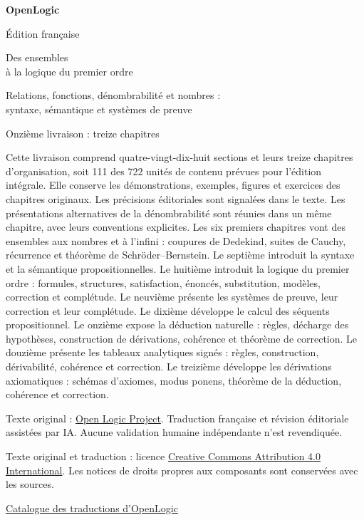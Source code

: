 \documentclass[11pt,a4paper,openany]{memoir}
\begin{document}
\frontmatter
\begin{titlingpage}
\setlength{\parindent}{0pt}
\vspace*{15mm}
{\sffamily\Huge\bfseries OpenLogic\par}
\vspace{6mm}
{\sffamily\LARGE Édition française\par}
\vspace{14mm}
{\sffamily\huge Des ensembles\\à la logique du premier ordre\par}
\vspace{5mm}
{\large Relations, fonctions, dénombrabilité et nombres :\\
syntaxe, sémantique et systèmes de preuve\par}
\vfill
{\large Onzième livraison : treize chapitres\par}
\vspace{4mm}
Cette livraison comprend quatre-vingt-dix-huit sections et leurs treize chapitres d’organisation,
soit 111 des 722 unités de contenu prévues pour l’édition intégrale.
Elle conserve les démonstrations, exemples, figures et exercices
des chapitres originaux. Les précisions éditoriales sont signalées
dans le texte. Les présentations alternatives de la dénombrabilité
sont réunies dans un même chapitre, avec leurs conventions explicites.
Les six premiers chapitres vont des ensembles aux nombres et à l’infini :
coupures de Dedekind, suites de Cauchy, récurrence et théorème de
Schröder--Bernstein. Le septième introduit la syntaxe et la sémantique
propositionnelles. Le huitième introduit la logique du premier ordre :
formules, structures, satisfaction, énoncés, substitution, modèles,
correction et complétude. Le neuvième présente les systèmes de preuve,
leur correction et leur complétude. Le dixième développe le calcul
des séquents propositionnel. Le onzième expose la déduction naturelle :
règles, décharge des hypothèses, construction de dérivations,
cohérence et théorème de correction. Le douzième présente les tableaux
analytiques signés : règles, construction, dérivabilité, cohérence et
correction. Le treizième développe les dérivations axiomatiques :
schémas d’axiomes, modus ponens, théorème de la déduction, cohérence
et correction.
\vspace{7mm}
\par\small
Texte original : \href{https://openlogicproject.org/}{Open Logic Project}.
Traduction française et révision éditoriale assistées par IA.
Aucune validation humaine indépendante n'est revendiquée.
\par\medskip
Texte original et traduction : licence
\href{https://creativecommons.org/licenses/by/4.0/}{Creative Commons
Attribution 4.0 International}. Les notices de droits propres aux
composants sont conservées avec les sources.
\par\medskip
\href{https://kokunoyumeto.github.io/OpenLogic-translations/}{Catalogue
des traductions d'OpenLogic}
\end{titlingpage}
\end{document}

